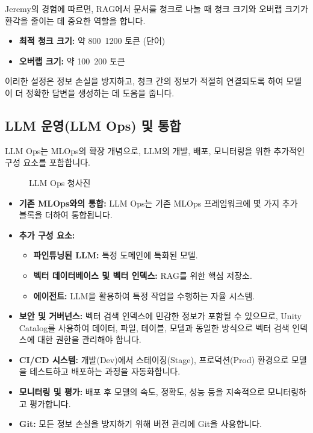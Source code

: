 \documentclass[11pt,a4paper]{article}
\theoremstyle{definition}
\begin{document}
\begin{tcolorbox}[examplebox={RAG 청킹(Chunking) 및 오버랩(Overlap)}]
    Jeremy의 경험에 따르면, RAG에서 문서를 청크로 나눌 때 청크 크기와 오버랩 크기가 환각을 줄이는 데 중요한 역할을 합니다.
    \begin{itemize}
        \item \textbf{최적 청크 크기:} 약 800~1200 토큰 (단어)
        \item \textbf{오버랩 크기:} 약 100~200 토큰
    \end{itemize}
    이러한 설정은 정보 손실을 방지하고, 청크 간의 정보가 적절히 연결되도록 하여 모델이 더 정확한 답변을 생성하는 데 도움을 줍니다.
\end{tcolorbox}

\subsection{LLM 운영(LLM Ops) 및 통합}

LLM Ops는 MLOps의 확장 개념으로, LLM의 개발, 배포, 모니터링을 위한 추가적인 구성 요소를 포함합니다.

\begin{figure}[h!]
    \centering
    \caption{LLM Ops 청사진}
    \label{fig:llm_ops_blueprint}
\end{figure}

\begin{itemize}
    \item \textbf{기존 MLOps와의 통합:} LLM Ops는 기존 MLOps 프레임워크에 몇 가지 추가 블록을 더하여 통합됩니다.
    \item \textbf{추가 구성 요소:}
    \begin{itemize}
        \item \textbf{파인튜닝된 LLM:} 특정 도메인에 특화된 모델.
        \item \textbf{벡터 데이터베이스 및 벡터 인덱스:} RAG를 위한 핵심 저장소.
        \item \textbf{에이전트:} LLM을 활용하여 특정 작업을 수행하는 자율 시스템.
    \end{itemize}
    \item \textbf{보안 및 거버넌스:} 벡터 검색 인덱스에 민감한 정보가 포함될 수 있으므로, Unity Catalog를 사용하여 데이터, 파일, 테이블, 모델과 동일한 방식으로 벡터 검색 인덱스에 대한 권한을 관리해야 합니다.
    \item \textbf{CI/CD 시스템:} 개발(Dev)에서 스테이징(Stage), 프로덕션(Prod) 환경으로 모델을 테스트하고 배포하는 과정을 자동화합니다.
    \item \textbf{모니터링 및 평가:} 배포 후 모델의 속도, 정확도, 성능 등을 지속적으로 모니터링하고 평가합니다.
    \item \textbf{Git:} 모든 정보 손실을 방지하기 위해 버전 관리에 Git을 사용합니다.
\end{itemize}
\end{document}
